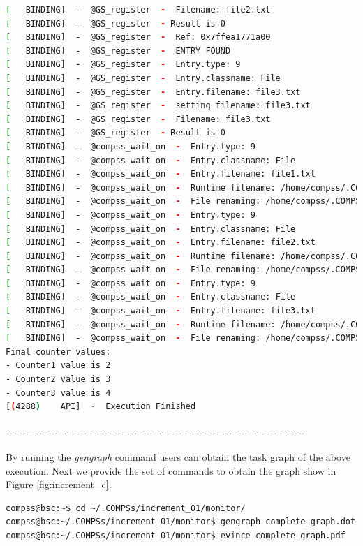 \begin{lstlisting}[language=bash]
[   BINDING]  -  @GS_register  -  Filename: file2.txt
[   BINDING]  -  @GS_register  - Result is 0
[   BINDING]  -  @GS_register  -  Ref: 0x7ffea1771a00
[   BINDING]  -  @GS_register  -  ENTRY FOUND
[   BINDING]  -  @GS_register  -  Entry.type: 9
[   BINDING]  -  @GS_register  -  Entry.classname: File
[   BINDING]  -  @GS_register  -  Entry.filename: file3.txt
[   BINDING]  -  @GS_register  -  setting filename: file3.txt
[   BINDING]  -  @GS_register  -  Filename: file3.txt
[   BINDING]  -  @GS_register  - Result is 0
[   BINDING]  -  @compss_wait_on  -  Entry.type: 9
[   BINDING]  -  @compss_wait_on  -  Entry.classname: File
[   BINDING]  -  @compss_wait_on  -  Entry.filename: file1.txt
[   BINDING]  -  @compss_wait_on  -  Runtime filename: /home/compss/.COMPSs/increment_01/tmpFiles/d1v11_1479142004112.IT
[   BINDING]  -  @compss_wait_on  -  File renaming: /home/compss/.COMPSs/increment_01/tmpFiles/d1v11_1479142004112.IT to file1.txt
[   BINDING]  -  @compss_wait_on  -  Entry.type: 9
[   BINDING]  -  @compss_wait_on  -  Entry.classname: File
[   BINDING]  -  @compss_wait_on  -  Entry.filename: file2.txt
[   BINDING]  -  @compss_wait_on  -  Runtime filename: /home/compss/.COMPSs/increment_01/tmpFiles/d2v11_1479142004112.IT
[   BINDING]  -  @compss_wait_on  -  File renaming: /home/compss/.COMPSs/increment_01/tmpFiles/d2v11_1479142004112.IT to file2.txt
[   BINDING]  -  @compss_wait_on  -  Entry.type: 9
[   BINDING]  -  @compss_wait_on  -  Entry.classname: File
[   BINDING]  -  @compss_wait_on  -  Entry.filename: file3.txt
[   BINDING]  -  @compss_wait_on  -  Runtime filename: /home/compss/.COMPSs/increment_01/tmpFiles/d3v11_1479142004112.IT
[   BINDING]  -  @compss_wait_on  -  File renaming: /home/compss/.COMPSs/increment_01/tmpFiles/d3v11_1479142004112.IT to file3.txt
Final counter values: 
- Counter1 value is 2
- Counter2 value is 3
- Counter3 value is 4
[(4288)    API]  -  Execution Finished

------------------------------------------------------------
\end{lstlisting}

By running the \textit{gengraph} command users can obtain the task graph of the above execution. Next we provide the set of commands
to obtain the graph show in Figure \ref{fig:increment_c}.

\begin{lstlisting}[language=bash]
compss@bsc:~$ cd ~/.COMPSs/increment_01/monitor/
compss@bsc:~/.COMPSs/increment_01/monitor$ gengraph complete_graph.dot
compss@bsc:~/.COMPSs/increment_01/monitor$ evince complete_graph.pdf
\end{lstlisting}

